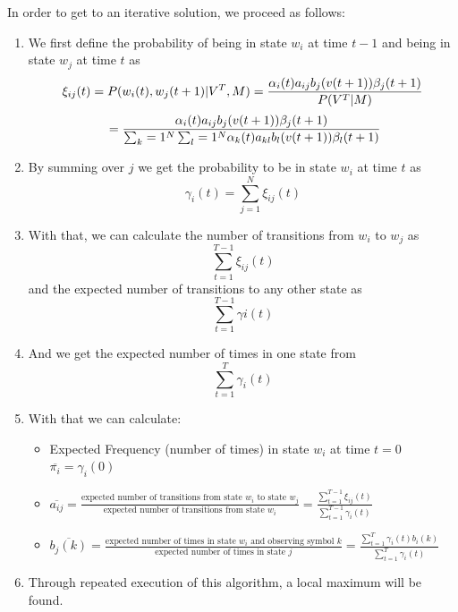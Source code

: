 \documentclass[a4paper, oneside]{csthesis}
\begin{document}
In order to get to an iterative solution, we proceed as follows:
\begin{enumerate}
\item We first define the probability of being in state $w_i$ at time $t-1$ and being in state $w_j$ at time $t$ as
$$
\xi_{ij} (t) = P(w_i(t), w_j(t+1)| V^T, M)
\\= \frac{\alpha_i(t)a_{ij}b_j(v(t+1))\beta_j(t+1)}{P(V^T|M)}
$$ $$\\= \frac{\alpha_i(t)a_{ij}b_j(v(t+1))\beta_j(t+1)}{\sum_k = 1^N \sum_l = 1^N \alpha_k(t)a_{kl}b_l(v(t+1))\beta_l(t+1)}
$$

\item By summing over $j$ we get the probability to be in state $w_i$ at time $t$ as
$$\gamma_i(t) = \sum\limits_{j=1}^N \xi_{ij}(t)$$

\item With that, we can calculate the number of transitions from $w_i$ to $w_j$ as
$$\sum\limits_{t=1}^{T-1} \xi_{ij}(t)$$
and the expected number of transitions to any other state as
$$\sum\limits_{t=1}^{T-1} \gamma{i}(t)$$
\item And we get the expected number of times in one state from
$$\sum\limits_{t=1}^T\gamma_i(t)$$
\item With that we can calculate:
\begin{itemize}
\item Expected Frequency (number of times) in state $w_i$ at time $t=0$ $\overline{\pi_i}= \gamma_i(0)$
\item $\overline{a_{ij}} = \frac{\mbox{expected number of transitions from state $w_i$ to state $w_j$}}{\mbox{expected number of transitions from state $w_i$}} = \frac{\sum_{t=1}^{T-1}\xi_{ij}(t)}{\sum_{t=1}^{T-1} \gamma_i(t)}$
\item $\overline{b_j(k)} = \frac{\mbox{expected number of times in state $w_i$ and observing symbol $k$}}{\mbox{expected number of times in state $j$}} = \frac{\sum_{t=1}^T \gamma_i(t)b_i(k)}{\sum_{t=1}^T \gamma_i(t)}$

\end{itemize}

\item Through repeated execution of this algorithm, a local maximum will be found.

\end{enumerate}








\end{document}
